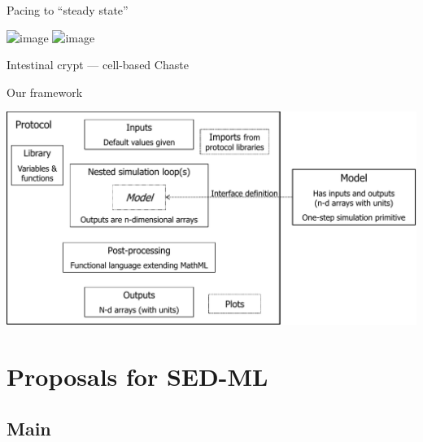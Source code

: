 \documentclass[t,xcolor={usenames,dvipsnames}]{beamer}
\begin{document}
\begin{frame}{Pacing to ``steady state''}
\begin{center}
\includegraphics<1>[width=\textwidth]{matsuoka_pace_all_state_variables}
\includegraphics<2>[width=\textwidth]{st_st_diag}
\end{center}
\end{frame}


\begin{frame}{Intestinal crypt --- cell-based Chaste}
\begin{center}
\end{center}
\end{frame}


\begin{frame}{Our framework}
\begin{center}
\vspace{-.5cm}\hspace*{-.75cm}\includegraphics[width=1.15\textwidth]{proto_diag}
\end{center}
\end{frame}

\section{Proposals for SED-ML}
\subsection*{Main}
\end{document}
